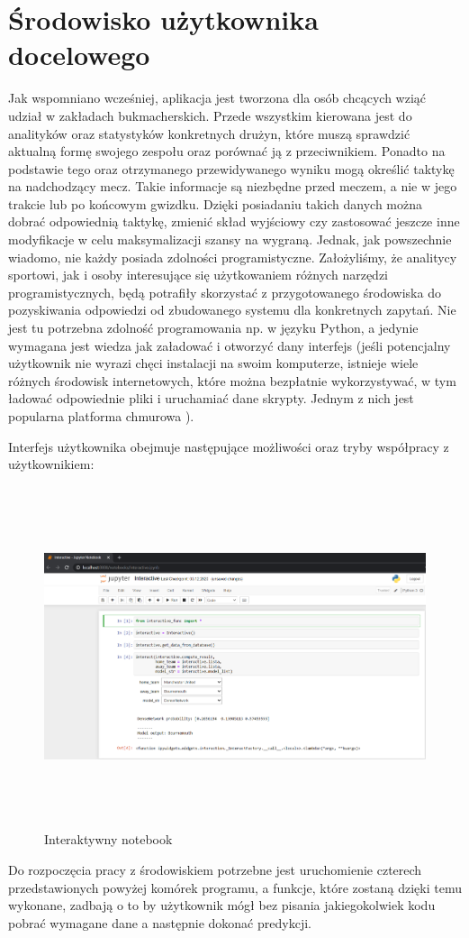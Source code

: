 \section{Środowisko użytkownika docelowego}
\noindent
Jak wspomniano wcześniej, aplikacja jest tworzona dla osób chcących wziąć udział w zakładach bukmacherskich. Przede wszystkim kierowana jest do analityków oraz statystyków konkretnych drużyn, które muszą sprawdzić aktualną formę swojego zespołu oraz porównać ją z przeciwnikiem. Ponadto na podstawie tego oraz otrzymanego przewidywanego wyniku mogą określić taktykę na nadchodzący mecz. Takie informacje są niezbędne przed meczem, a nie w jego trakcie lub po końcowym gwizdku. Dzięki posiadaniu takich danych można dobrać odpowiednią taktykę, zmienić skład wyjściowy czy zastosować jeszcze inne modyfikacje w celu maksymalizacji szansy na wygraną. Jednak, jak powszechnie wiadomo, nie każdy posiada zdolności programistyczne. Założyliśmy, że analitycy sportowi, jak i osoby interesujące się użytkowaniem różnych narzędzi programistycznych, będą potrafiły skorzystać z przygotowanego środowiska do pozyskiwania odpowiedzi od zbudowanego systemu dla konkretnych zapytań. Nie jest tu potrzebna zdolność programowania np. w języku Python, a jedynie wymagana jest wiedza jak załadować i otworzyć dany interfejs (jeśli potencjalny użytkownik nie wyrazi chęci instalacji  na swoim komputerze, istnieje wiele różnych środowisk internetowych, które można bezpłatnie wykorzystywać, w tym ładować odpowiednie pliki i uruchamiać dane skrypty. Jednym z nich jest popularna platforma chmurowa ). 

Interfejs użytkownika obejmuje następujące możliwości oraz tryby współpracy z użytkownikiem:
\begin{figure}[H] 
        \centering\includegraphics[width=16cm,height=10cm]{figures/Interactive_overview.png}
        \caption{Interaktywny notebook}\label{interactive}
\end{figure}
Do rozpoczęcia pracy z środowiskiem potrzebne jest uruchomienie czterech przedstawionych powyżej komórek programu, a funkcje, które zostaną dzięki temu wykonane, zadbają o to by użytkownik mógł bez pisania jakiegokolwiek kodu pobrać wymagane dane a następnie dokonać predykcji.


